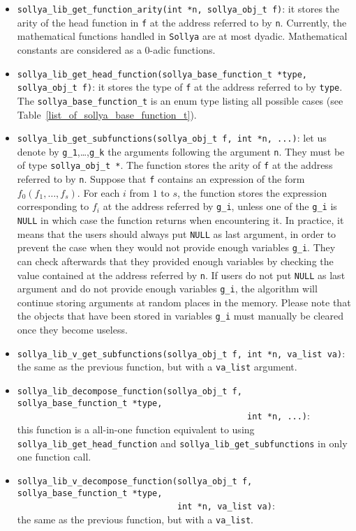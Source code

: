 \documentclass[a4paper]{article}
\newcommand{\sollya}{\texttt{Sollya}\xspace}
\begin{document}
\begin{itemize}
\item \verb|sollya_lib_get_function_arity(int *n, sollya_obj_t f)|: it stores the arity of the head function in \texttt{f} at the address referred to by \texttt{n}. Currently, the mathematical functions handled in \sollya are at most dyadic. Mathematical constants are considered as a 0-adic functions.
\item \verb|sollya_lib_get_head_function(sollya_base_function_t *type, sollya_obj_t f)|: it stores the type of \texttt{f} at the address referred to by \texttt{type}. The \texttt{sollya\_base\_function\_t} is an enum type listing all possible cases (see Table~\ref{list_of_sollya_base_function_t}).
\item \verb|sollya_lib_get_subfunctions(sollya_obj_t f, int *n, ...)|: let us denote by \texttt{g\_1},\dots,\texttt{g\_k} the arguments following the argument \texttt{n}. They must be of type \verb|sollya_obj_t *|. The function stores the arity of \texttt{f} at the address referred to by \texttt{n}. Suppose that \texttt{f} contains an expression of the form $f_0(f_1,\dots,f_s)$. For each $i$ from $1$ to $s$, the function stores the expression corresponding to $f_i$ at the address referred by \texttt{g\_i}, unless one of the \texttt{g\_i} is \texttt{NULL} in which case the function returns when encountering it. In practice, it means that the users should always put \texttt{NULL} as last argument, in order to prevent the case when they would not provide enough variables \texttt{g\_i}. They can check afterwards that they provided enough variables by checking the value contained at the address referred by \texttt{n}. If users do not put \texttt{NULL} as last argument and do not provide enough variables \texttt{g\_i}, the algorithm will continue storing arguments at random places in the memory. Please note that the objects that have been stored in variables \texttt{g\_i} must manually be cleared once they become useless.
\item \verb|sollya_lib_v_get_subfunctions(sollya_obj_t f, int *n, va_list va)|: the same as the previous function, but with a \texttt{va\_list} argument.
\item \verb|sollya_lib_decompose_function(sollya_obj_t f, sollya_base_function_t *type,|\\
      \verb|                                              int *n, ...)|:\\
this function is a all-in-one function equivalent to using \verb|sollya_lib_get_head_function| and \verb|sollya_lib_get_subfunctions| in only one function call.
\item \verb|sollya_lib_v_decompose_function(sollya_obj_t f, sollya_base_function_t *type,|\\
      \verb|                                int *n, va_list va)|:\\
the same as the previous function, but with a \texttt{va\_list}.
\end{itemize}
\end{document}
